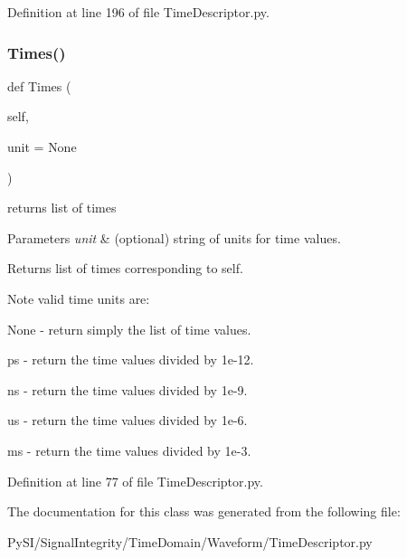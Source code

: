 Definition at line 196 of file Time\+Descriptor.\+py.

\mbox{\label{classSignalIntegrity_1_1TimeDomain_1_1Waveform_1_1TimeDescriptor_1_1TimeDescriptor_a5ba53f81d111ea013ebb7f55ed99d959}} 
\subsubsection{\texorpdfstring{Times()}{Times()}}
{\footnotesize\ttfamily def Times (\begin{DoxyParamCaption}\item[{}]{self,  }\item[{}]{unit = {\ttfamily None} }\end{DoxyParamCaption})}



returns list of times 


\begin{DoxyParams}{Parameters}
{\em unit} & (optional) string of units for time values. \\
\hline
\end{DoxyParams}
\begin{DoxyReturn}{Returns}
list of times corresponding to self. 
\end{DoxyReturn}
\begin{DoxyNote}{Note}
valid time units are\+:
\begin{DoxyItemize}
\item None -\/ return simply the list of time values.
\item \textquotesingle{}ps\textquotesingle{} -\/ return the time values divided by 1e-\/12.
\item \textquotesingle{}ns\textquotesingle{} -\/ return the time values divided by 1e-\/9.
\item \textquotesingle{}us\textquotesingle{} -\/ return the time values divided by 1e-\/6.
\item \textquotesingle{}ms\textquotesingle{} -\/ return the time values divided by 1e-\/3. 
\end{DoxyItemize}
\end{DoxyNote}


Definition at line 77 of file Time\+Descriptor.\+py.



The documentation for this class was generated from the following file\+:\begin{DoxyCompactItemize}
\item 
Py\+S\+I/\+Signal\+Integrity/\+Time\+Domain/\+Waveform/Time\+Descriptor.\+py\end{DoxyCompactItemize}
